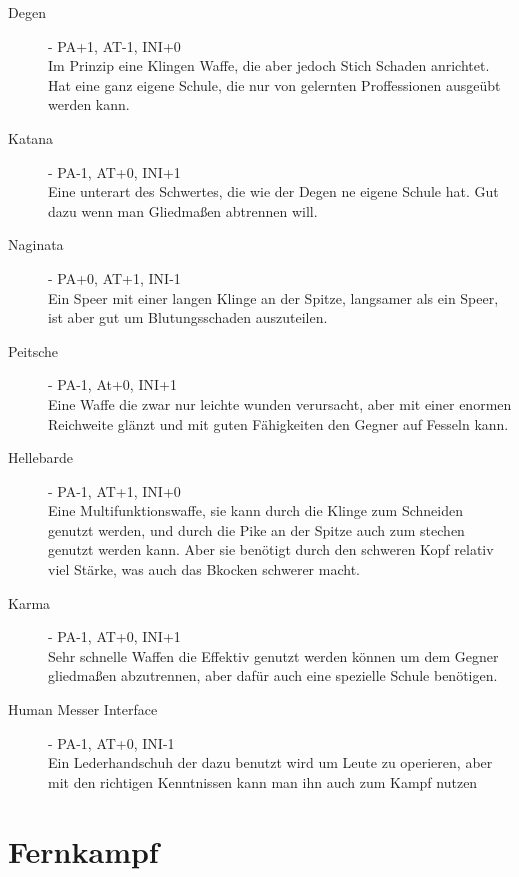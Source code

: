\documentclass[a4paper,12pt,oneside]{book}
\begin{document}
\begin{description}
\item[Degen] - PA+1, AT-1, INI+0
\\Im Prinzip eine Klingen Waffe, die aber jedoch Stich Schaden anrichtet. Hat eine ganz eigene Schule, die nur von gelernten Proffessionen ausgeübt werden kann.
\item[Katana] - PA-1, AT+0, INI+1
\\Eine unterart des Schwertes, die wie der Degen ne eigene Schule hat. Gut dazu wenn man Gliedmaßen abtrennen will.
\item[Naginata] - PA+0, AT+1, INI-1
\\Ein Speer mit einer langen Klinge an der Spitze, langsamer als ein Speer, ist aber gut um Blutungsschaden auszuteilen.
\item[Peitsche] - PA-1, At+0, INI+1
\\Eine Waffe die zwar nur leichte wunden verursacht, aber mit einer enormen Reichweite glänzt und mit guten Fähigkeiten den Gegner auf Fesseln kann.
\item[Hellebarde] - PA-1, AT+1, INI+0
\\Eine Multifunktionswaffe, sie kann durch die Klinge zum Schneiden genutzt werden, und durch die Pike an der Spitze auch zum stechen genutzt werden kann. Aber sie benötigt durch den schweren Kopf relativ viel Stärke, was auch das Bkocken schwerer macht.
\item[Karma] - PA-1, AT+0, INI+1 
\\Sehr schnelle Waffen die Effektiv genutzt werden können um dem Gegner gliedmaßen abzutrennen, aber dafür auch eine spezielle Schule benötigen.
\item[Human Messer Interface] - PA-1, AT+0, INI-1
\\Ein Lederhandschuh der dazu benutzt wird um Leute zu operieren, aber mit den richtigen Kenntnissen kann man ihn auch zum Kampf nutzen
\end {description}

\chapter{Fernkampf}
\end{document}
